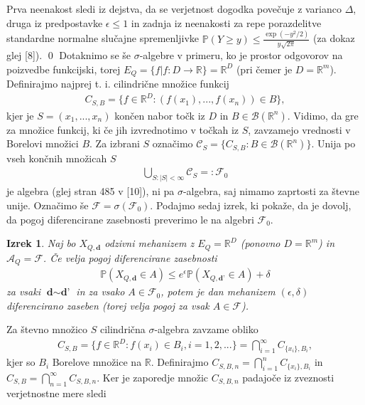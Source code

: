 \documentclass[12pt,a4paper]{amsart}
\theoremstyle{definition} %
\theoremstyle{plain} %
\newtheorem{izrek}[definicija]{Izrek}
\begin{document}
Prva neenakost sledi iz dejstva, da se verjetnost dogodka povečuje z varianco $\Delta$, druga iz predpostavke $\epsilon \leq 1$ in zadnja iz neenakosti za repe porazdelitve standardne normalne slučajne spremenljivke $\mathbb{P}(Y \geq y) \leq \frac{\exp(-y^2 / 2)}{y \sqrt{2\pi}}$ (za dokaz glej [8]).
\qed
\newline
\newline
Dotaknimo se še $\sigma$-algebre v primeru, ko je prostor odgovorov na poizvedbe funkcijski, torej $E_Q = \{f | f : D \rightarrow \mathbb{R}\} = \mathbb{R}^D$ (pri čemer je $D=\mathbb{R}^m$). Definirajmo najprej t. i. cilindrične množice funkcij 
\begin{gather*}
C_{S,B} = \{ f \in \mathbb{R}^D : (f(x_1), ..., f(x_n)) \in B \},
\end{gather*}
kjer je $S = (x_1,...,x_n)$ končen nabor točk iz $D$ in $B \in \mathcal{B}(\mathbb{R}^n)$. Vidimo, da gre za množice funkcij, ki če jih izvrednotimo v točkah iz $S$, zavzamejo vrednosti v Borelovi množici $B$. Za izbrani $S$ označimo $\mathcal{C}_S = \{ C_{S,B} : B \in \mathcal{B}(\mathbb{R}^n) \}$. Unija po vseh končnih množicah $S$
\begin{gather*}
\bigcup_{S : |S| < \infty} \mathcal{C}_S =: \mathcal{F}_0
\end{gather*}
je algebra (glej stran 485 v [10]), ni pa $\sigma$-algebra, saj nimamo zaprtosti za števne unije. Označimo še $\mathcal{F} = \sigma(\mathcal{F}_0)$. Podajmo sedaj izrek, ki pokaže, da je dovolj, da pogoj diferencirane zasebnosti preverimo le na algebri $\mathcal{F}_0$. 
\begin{izrek}
Naj bo $X_{Q,\textbf{d}}$ odzivni mehanizem z $E_Q = \mathbb{R}^D$ (ponovno $D = \mathbb{R}^m$) in $\mathcal{A}_Q = \mathcal{F}$. Če velja pogoj diferencirane zasebnosti 
\begin{gather*}
\mathbb{P}(X_{Q,\textbf{d}} \in A) \leq e^\epsilon \mathbb{P}(X_{Q,\textbf{d'}} \in A) + \delta
\end{gather*}
za vsaki $\textbf{d} \sim \textbf{d'}$ in za vsako $A \in \mathcal{F}_0$, potem je dan mehanizem $(\epsilon, \delta)$ diferencirano zaseben (torej velja pogoj za vsak $A \in \mathcal{F}$).
\end{izrek}
\proof Za števno množico $S$ cilindrična $\sigma$-algebra zavzame obliko
\begin{gather*}
C_{S,B} = \{ f \in \mathbb{R}^D : f(x_i) \in B_i, i = 1,2,... \} = \bigcap_{i=1}^{\infty}C_{\{x_i\},B_i},
\end{gather*}
kjer so $B_i$ Borelove množice na $\mathbb{R}$. Definirajmo $C_{S,B,n} = \bigcap_{i=1}^{n}C_{\{x_i\},B_i}$ in $C_{S,B} = \bigcap_{n=1}^{\infty}C_{S,B,n}$. Ker je zaporedje množic $C_{S,B,n}$ padajoče iz zveznosti verjetnostne mere sledi
\end{document}
